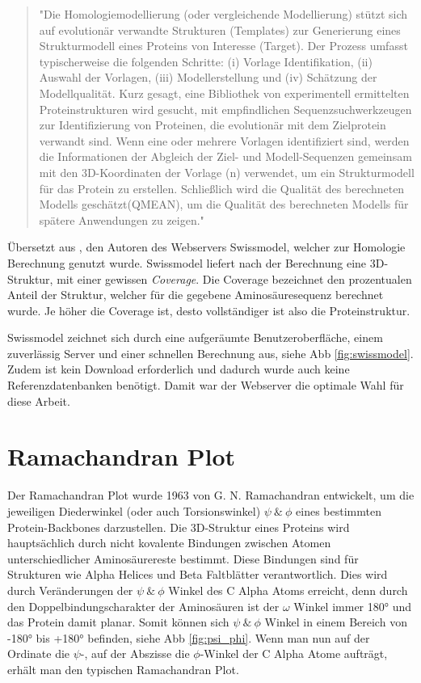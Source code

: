 \begin{quote}
    "Die Homologiemodellierung (oder vergleichende Modellierung) stützt sich auf evolutionär verwandte Strukturen (Templates) zur Generierung eines Strukturmodell eines Proteins von Interesse (Target). Der Prozess umfasst typischerweise die folgenden Schritte: (i) Vorlage Identifikation, (ii) Auswahl der Vorlagen, (iii) Modellerstellung und (iv) Schätzung der Modellqualität. Kurz gesagt, eine Bibliothek von experimentell ermittelten Proteinstrukturen wird gesucht, mit empfindlichen Sequenzsuchwerkzeugen zur Identifizierung von Proteinen, die evolutionär mit dem Zielprotein verwandt sind. Wenn eine oder mehrere Vorlagen identifiziert sind, werden die Informationen der Abgleich der Ziel- und Modell-Sequenzen gemeinsam mit den 3D-Koordinaten der Vorlage (n) verwendet, um ein Strukturmodell für das Protein zu erstellen. Schließlich wird die Qualität des berechneten Modells geschätzt(QMEAN), um die Qualität des berechneten Modells für spätere Anwendungen zu zeigen."
\end{quote}

Übersetzt aus \cite{Biasini.2014}, den Autoren des Webservers Swissmodel, welcher zur Homologie Berechnung genutzt wurde. Swissmodel liefert nach der Berechnung eine 3D-Struktur, mit einer gewissen \emph{Coverage}. Die Coverage bezeichnet den prozentualen Anteil der Struktur, welcher für die gegebene Aminosäuresequenz berechnet wurde. Je höher die Coverage ist, desto vollständiger ist also die Proteinstruktur.

Swissmodel zeichnet sich durch eine aufgeräumte Benutzeroberfläche, einem zuverlässig Server und einer schnellen Berechnung aus, siehe \ac{Abb} \ref{fig:swissmodel}. Zudem ist kein Download erforderlich und dadurch wurde auch keine Referenzdatenbanken benötigt. Damit war der Webserver die optimale Wahl für diese Arbeit.



\section{Ramachandran Plot}
\label{sec:ramachandran}
Der Ramachandran Plot wurde 1963 von G. N. Ramachandran \cite{RAMACHANDRAN.1963} entwickelt, um die jeweiligen Diederwinkel (oder auch Torsionswinkel)  $\psi\ \&\ \phi$ eines bestimmten Protein-Backbones darzustellen. Die 3D-Struktur eines Proteins wird hauptsächlich durch nicht kovalente Bindungen zwischen Atomen unterschiedlicher Aminosäurereste bestimmt. Diese Bindungen sind für Strukturen wie Alpha Helices und Beta Faltblätter verantwortlich. Dies wird durch Veränderungen der  $\psi\ \&\ \phi$ Winkel des C Alpha Atoms erreicht, denn durch den Doppelbindungscharakter der Aminosäuren ist der $\omega$ Winkel immer 180° und das Protein damit planar. Somit können sich $\psi\ \&\ \phi$ Winkel in einem Bereich von -180° bis +180° befinden, siehe \ac{Abb} \ref{fig:psi_phi}. Wenn man nun auf der Ordinate die $\psi$-, auf der Abszisse die $\phi$-Winkel der C Alpha Atome aufträgt, erhält man den typischen Ramachandran Plot. 

